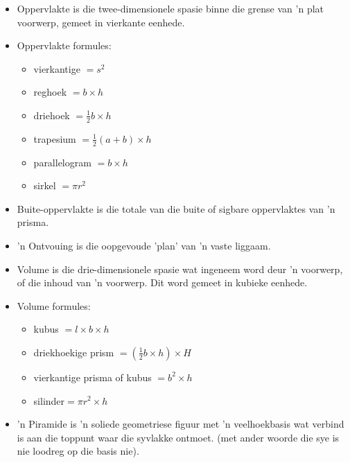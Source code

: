 \begin{itemize}[noitemsep]
 \item Oppervlakte is die twee-dimensionele spasie binne die grense van 'n plat voorwerp, gemeet in vierkante eenhede.
\item Oppervlakte formules:
\begin{itemize}[noitemsep]
\item vierkantige $= s^2$
\item reghoek $= b \times h$
\item driehoek $= \frac{1}{2} b \times h$
\item trapesium $= \frac{1}{2} (a+b) \times h$
\item parallelogram $= b \times h$
\item sirkel $= \pi r^2$
\end{itemize}
\item Buite-oppervlakte is die totale van die buite of sigbare oppervlaktes van 'n prisma.
\item 'n Ontvouing is die oopgevoude 'plan' van 'n vaste liggaam.
\item Volume is die drie-dimensionele spasie wat ingeneem word deur 'n voorwerp, of die inhoud van 'n voorwerp. Dit word gemeet in kubieke eenhede.
\item Volume formules:
\begin{itemize}[noitemsep]
\item kubus $=l \times b \times h$
\item driekhoekige prism $= (\frac{1}{2} b \times h) \times H$
\item vierkantige prisma of kubus $=b^2 \times h$
\item silinder$=\pi r^2 \times h$
\end{itemize}
\item ’n Piramide is ’n soliede geometriese figuur met ’n veelhoekbasis wat verbind is aan
die toppunt waar die syvlakke ontmoet. (met ander woorde die sye is nie loodreg op
die basis nie).


\end{itemize}
